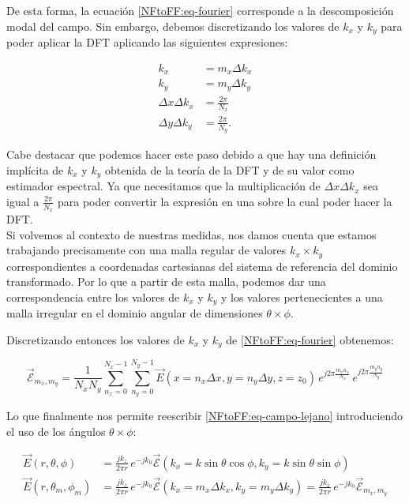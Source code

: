 \documentclass{article}
\begin{document}
De esta forma, la ecuación \eqref{NFtoFF:eq-fourier} corresponde a la descomposición modal del campo. Sin embargo, debemos discretizando los valores de $k_{x}$ y $k_{y}$ para poder aplicar la DFT aplicando las siguientes expresiones: 

\begin{subequations}
\begin{align}
k_{x}&= m_{x}\Delta k_{x}
\\
k_{y}&= m_{y}\Delta k_{y}
\\
\Delta x \Delta k_{x}&=\frac{2\pi}{N_{x}}
\\
\Delta y \Delta k_{y}&=\frac{2\pi}{N_{y}}.
\end{align}
\end{subequations}

Cabe destacar que podemos hacer este paso debido a que hay una definición implícita de $k_{x}$ y $k_{y}$ obtenida de la teoría de la DFT y de su valor como estimador espectral. Ya que necesitamos que la multiplicación de $\Delta x \Delta k_{x}$ sea igual a $\frac{2\pi}{N_{x}}$ para poder convertir la expresión en una sobre la cual poder hacer la DFT.\\

Si volvemos al contexto de nuestras medidas, nos damos cuenta que estamos trabajando precisamente con una malla regular de valores $k_{x}\times k_{y}$ correspondientes a coordenadas cartesianas del sistema de referencia del dominio transformado. Por lo que a partir de esta malla, podemos dar una correspondencia entre los valores de $k_{x}$ y $k_{y}$ y los valores pertenecientes a una malla irregular en el dominio angular de dimensiones $\theta \times \phi$.

\newpage

Discretizando entonces los valores de $k_{x}$ y $k_{y}$ de \eqref{NFtoFF:eq-fourier} obtenemos: 

\begin{equation}
{\vec{\mathcal{E}}}_{m_{x},m_{y}}=\frac{1}{N_{x} N_{y}}
\sum_{n_{x}=0}^{N_{x}-1}\sum_{n_{y}=0}^{N_{y}-1}
\vec{E}(x=n_{x}\Delta x,y=n_{y} \Delta y,z=z_{0}) \,e^{j 2\pi
\frac{m_{x} n_{x}}{N_{x}}}\,e^{j 2\pi \frac{m_{y} n_{y}}{N_{y}}}
\label{eq-fft1}
\end{equation}

Lo que finalmente nos permite reescribir \eqref{NFtoFF:eq-campo-lejano} introduciendo el uso de los ángulos $\theta \times \phi$:

\begin{align}
\vec{E}(r,\theta,\phi)&=\frac{jk_{z}}{2\pi r}\,e^{-jk_{0}}{{\vec{\mathcal{E}}}}(k_{x}=k \sin\theta \cos\phi,k_{y}= k\sin\theta \sin\phi)\nonumber
\\
\vec{E}(r,\theta_{m},\phi_{m})&=\frac{jk_{z}}{2\pi r}\,e^{-jk_{0}}{{\vec{\mathcal{E}}}}(k_{x}=m_{x}\Delta k_{x},k_{y}= m_{y}\Delta k_{y})=\frac{jk_{z}}{2\pi r}\,e^{-jk_{0}}{{\vec{\mathcal{E}}}}_{m_{x},m_{y}}\nonumber
\\
\label{eq-fourier3}
\end{align}
\end{document}
